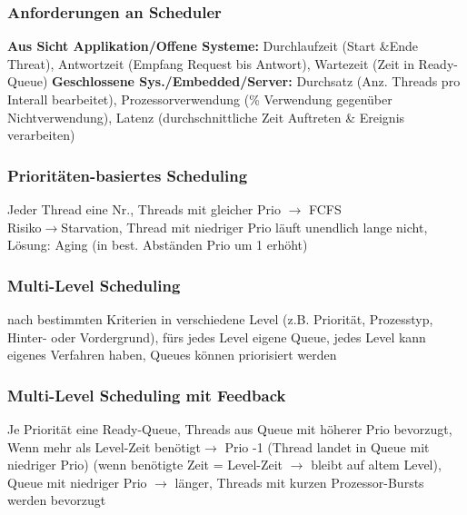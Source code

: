 \subsubsection{Anforderungen an Scheduler}
\textbf{Aus Sicht Applikation/Offene Systeme: }Durchlaufzeit (Start \&Ende Threat), Antwortzeit (Empfang Request bis Antwort), Wartezeit (Zeit in Ready-Queue) \textbf{Geschlossene Sys./Embedded/Server: }Durchsatz (Anz. Threads pro Interall bearbeitet), Prozessorverwendung (\% Verwendung gegenüber Nichtverwendung), Latenz (durchschnittliche Zeit Auftreten \& Ereignis verarbeiten)
\subsubsection{Prioritäten-basiertes Scheduling}
Jeder Thread eine Nr., Threads mit gleicher Prio $\rightarrow$ FCFS\\
Risiko$\rightarrow$Starvation, Thread mit niedriger Prio läuft unendlich lange nicht, Lösung: Aging (in best. Abständen Prio um 1 erhöht)
\subsubsection{Multi-Level Scheduling}
nach bestimmten Kriterien in verschiedene Level (z.B. Priorität, Prozesstyp, Hinter- oder Vordergrund), fürs jedes Level eigene Queue, jedes Level kann eigenes Verfahren haben, Queues können priorisiert werden
\subsubsection{Multi-Level Scheduling mit Feedback}
Je Priorität eine Ready-Queue, Threads aus Queue mit höherer Prio bevorzugt, Wenn mehr als Level-Zeit benötigt$\rightarrow$ Prio -1 (Thread landet in Queue mit niedriger Prio) (wenn benötigte Zeit = Level-Zeit $\rightarrow$ bleibt auf altem Level), Queue mit niedriger Prio $\rightarrow$ länger, Threads mit kurzen Prozessor-Bursts werden bevorzugt




